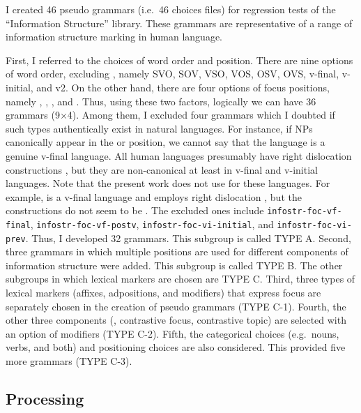 I created 46 pseudo grammars (i.e.\ 46 choices files) for regression
tests of the ``Information Structure'' library.
These grammars are representative of a range of information structure
marking in human language.



First, I referred to the choices of word order and 
position. There are nine options of word order, excluding , namely SVO, SOV, VSO, VOS, OSV, OVS, v-final,
v-initial, and v2. On the other hand, there are four options of focus
positions, namely , ,
, and . Thus, using these two factors,
logically we can have 36 grammars (9\ensuremath{\times}4). Among
them, I excluded four grammars which I doubted if such types
authentically exist in natural languages. For instance, if NPs
canonically appear in the  or 
position, we cannot say that the language is a genuine v-final
language. All human languages presumably have right dislocation
constructions \citep{lambrecht:96}, but they are non-canonical at
least in v-final and v-initial languages. Note that the present work
does not use  for these languages.  For
example,  is a v-final language and employs right
dislocation \citep{kim:11}, but the constructions do not seem to be
. The excluded ones include
\texttt{infostr-foc-vf-final}, \texttt{infostr-foc-vf-postv},
\texttt{infostr-foc-vi-initial}, and \texttt{infostr-foc-vi-prev}.
Thus, I developed 32 grammars. This subgroup is called TYPE A.
Second, three grammars in which multiple positions are used for
different components of information structure were added.  This
subgroup is called TYPE B.  The other subgroups in which lexical
markers are chosen are TYPE C. Third, three types
of lexical markers (affixes, adpositions, and modifiers) that express
focus are separately chosen in the creation of pseudo grammars (TYPE
C-1). Fourth, the other three components (,
contrastive focus, contrastive topic) are selected with an option of
modifiers (TYPE C-2).  Fifth, the categorical choices (e.g.\ nouns,
verbs, and both) and positioning choices are also considered. This
provided five more grammars (TYPE C-3).


\subsection{Processing}
\label{13:ssec:testing}

